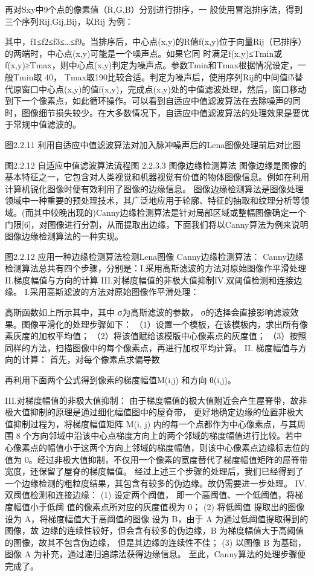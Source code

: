 再对Sxy中9个点的像素值（R,G,B）分别进行排序，一 般使用冒泡排序法，得到三个序列Rij,Gij,Bij，以Rij 为例：

其中，f1≤f2≤f3≤…≤f9。当排序后，中心点(x,y)的R值f(x,y)位于向量Rij（已排序） 的两端时，中心点(x,y)可能是一个噪声点。如果它同 时满足f(x,y)≤Tmin或f(x,y)≥Tmax，则中心点(x,y)判定为噪声点。参数Tmin和Tmax根据情况设定，一般Tmin取 40， Tmax取190比较合适。判定为噪声后，使用序列Rij的中间值f5替代原窗口中心点(x,y)的值f(x,y)，完成点(x,y)处的中值滤波处理，然后，窗口移动到下一个像素点，如此循环操作。可以看到自适应中值滤波算法在去除噪声的同时，图像细节损失较少。在大多数情况下，自适应中值滤波算法的处理效果是要优于常规中值滤波的。

图2.2.11 利用自适应中值滤波算法对加入脉冲噪声后的Lena图像处理前后对比图

图2.2.12 自适应中值滤波算法流程图
2.2.3.3 图像边缘检测算法
图像边缘是图像的基本特征之一，它包含对人类视觉和机器视觉有价值的物体图像信息。例如在利用计算机锐化图像时便有效利用了图像的边缘信息。 图像边缘检测算法是图像处理领域中一种重要的预处理技术，其广泛地应用于轮廓、特征的抽取和纹理分析等领域。(而其中较晚出现的)Canny边缘检测算法是针对局部区域或整幅图像确定一个门限[6]，对图像进行分割，从而提取出边缘，下面我们将以Canny算法为例来说明图像边缘检测算法的一种实现。

图2.2.12 应用一种边缘检测算法检测Lena图像
Canny边缘检测算法：
Canny边缘检测算法总共有四个步骤，分别是：I.采用高斯滤波的方法对原始图像作平滑处理 II.梯度幅值与方向的计算 III.对梯度幅值的非极大值抑制IV.双阈值检测和连接边缘。
I.采用高斯滤波的方法对原始图像作平滑处理：

高斯函数如上所示其中，其中 σ为高斯滤波的参数， σ的选择会直接影响滤波效果。图像平滑化的处理步骤如下：
（1）设置一个模板，在该模板内，求出所有像素灰度的加权平均值；
（2）将该值赋给该模版中心像素点的灰度值；
（3）按照同样的方法，扫描图像中的每个像素点，再进行加权平均计算。
II. 梯度幅值与方向的计算：
首先，对每个像素点求偏导数

再利用下面两个公式得到像素的梯度幅值M(i,j) 和方向 θ(i,j)。

III.对梯度幅值的非极大值抑制：
由于梯度幅值的极大值附近会产生屋脊带，故非极大值抑制的原理是通过细化幅值图中的屋脊带， 更好地确定边缘的位置非极大值抑制过程为，将梯度幅值矩阵 M(i, j) 内的每一个点都作为中心像素点，与其周围 8 个方向邻域中沿该中心点梯度方向上的两个邻域的梯度幅值进行比较。若中心像素点的幅值小于这两个方向上邻域的梯度幅值，则该中心像素点边缘标志位的值为 0。经过非极大值抑制，不仅用一个像素的宽度替代了梯度幅值矩阵的屋脊带宽度，还保留了屋脊的梯度幅值。
	经过上述三个步骤的处理后，我们已经得到了一个边缘检测的粗粒度结果，其包含有较多的伪边缘。故仍需要进一步处理。
IV.双阈值检测和连接边缘：
(1) 设定两个阈值， 即一个高阈值、一个低阈值，将梯度幅值小于低阈 值的像素点所对应的灰度值视为 0；
(2) 将低阈值 提取出的图像设为 A，将梯度幅值大于高阈值的图像 设为 B，由于 A 为通过低阈值提取得到的图像，故 边缘的连续性较好，但会含有较多的伪边缘，B 为梯度幅值大于高阈值的图像，故其不包含伪边缘， 但是其边缘的连续性不佳；
(3) 以图像 B 为基础， 图像 A 为补充，通过递归追踪法获得边缘信息。
至此，Canny算法的处理步骤便完成了。


